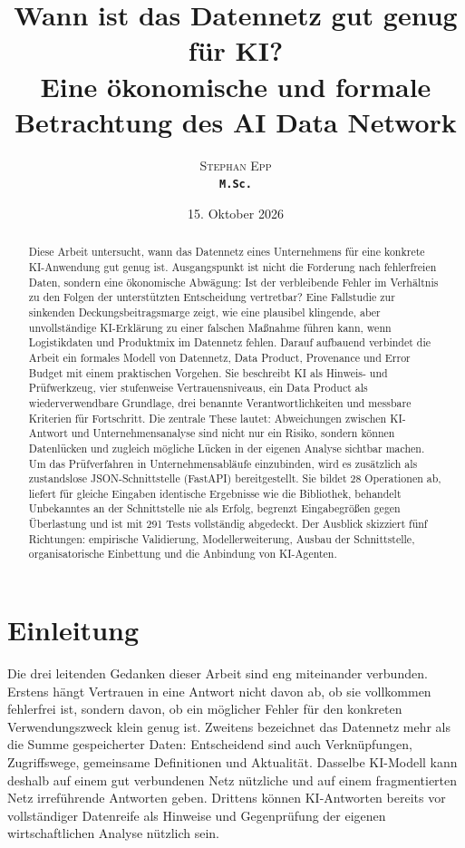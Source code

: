 \documentclass[a4paper,12pt]{article}
\title{\textbf{Wann ist das Datennetz gut genug für KI?}\\\large Eine ökonomische und formale Betrachtung des AI Data Network}
\author{\textsc{Stephan Epp}\\ {\small \texttt{\textbf{M.Sc.}}}}
\date{15. Oktober 2026}
\theoremstyle{definition}
\begin{document}
\maketitle

\begin{abstract}
Diese Arbeit untersucht, wann das Datennetz eines Unternehmens für eine konkrete KI-Anwendung gut genug ist. Ausgangspunkt ist nicht die Forderung nach fehlerfreien Daten, sondern eine ökonomische Abwägung: Ist der verbleibende Fehler im Verhältnis zu den Folgen der unterstützten Entscheidung vertretbar? Eine Fallstudie zur sinkenden Deckungsbeitragsmarge zeigt, wie eine plausibel klingende, aber unvollständige KI-Erklärung zu einer falschen Maßnahme führen kann, wenn Logistikdaten und Produktmix im Datennetz fehlen. Darauf aufbauend verbindet die Arbeit ein formales Modell von Datennetz, Data Product, Provenance und Error Budget mit einem praktischen Vorgehen. Sie beschreibt KI als Hinweis- und Prüfwerkzeug, vier stufenweise Vertrauensniveaus, ein Data Product als wiederverwendbare Grundlage, drei benannte Verantwortlichkeiten und messbare Kriterien für Fortschritt. Die zentrale These lautet: Abweichungen zwischen KI-Antwort und Unternehmensanalyse sind nicht nur ein Risiko, sondern können Datenlücken und zugleich mögliche Lücken in der eigenen Analyse sichtbar machen.
Um das Prüfverfahren in Unternehmensabläufe einzubinden, wird es zusätzlich als zustandslose JSON-Schnittstelle (FastAPI) bereitgestellt. Sie bildet 28 Operationen ab, liefert für gleiche Eingaben identische Ergebnisse wie die Bibliothek, behandelt Unbekanntes an der Schnittstelle nie als Erfolg, begrenzt Eingabegrößen gegen Überlastung und ist mit 291 Tests vollständig abgedeckt. Der Ausblick skizziert fünf Richtungen: empirische Validierung, Modellerweiterung, Ausbau der Schnittstelle, organisatorische Einbettung und die Anbindung von KI-Agenten.
\end{abstract}

\tableofcontents
\newpage

\section{Einleitung}
Die drei leitenden Gedanken dieser Arbeit sind eng miteinander verbunden. Erstens hängt Vertrauen in eine Antwort nicht davon ab, ob sie vollkommen fehlerfrei ist, sondern davon, ob ein möglicher Fehler für den konkreten Verwendungszweck klein genug ist. Zweitens bezeichnet das Datennetz mehr als die Summe gespeicherter Daten: Entscheidend sind auch Verknüpfungen, Zugriffswege, gemeinsame Definitionen und Aktualität. Dasselbe KI-Modell kann deshalb auf einem gut verbundenen Netz nützliche und auf einem fragmentierten Netz irreführende Antworten geben. Drittens können KI-Antworten bereits vor vollständiger Datenreife als Hinweise und Gegenprüfung der eigenen wirtschaftlichen Analyse nützlich sein.
\end{document}
